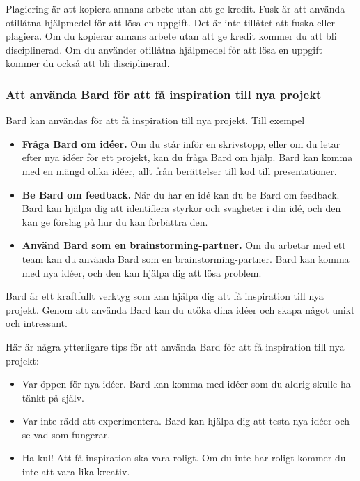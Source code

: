 Plagiering är att kopiera annans arbete utan att ge kredit. Fusk är att
använda otillåtna hjälpmedel för att lösa en uppgift. Det är inte
tillåtet att fuska eller plagiera. Om du kopierar annans arbete utan att
ge kredit kommer du att bli disciplinerad. Om du använder otillåtna
hjälpmedel för att lösa en uppgift kommer du också att bli
disciplinerad.

\hypertarget{att-anvuxe4nda-bard-fuxf6r-att-fuxe5-inspiration-till-nya-projekt}{%
\subsubsection{Att använda Bard för att få inspiration till nya
projekt}\label{att-anvuxe4nda-bard-fuxf6r-att-fuxe5-inspiration-till-nya-projekt}}

Bard kan användas för att få inspiration till nya projekt. Till exempel

\begin{itemize}
\tightlist
\item
  \textbf{Fråga Bard om idéer.} Om du står inför en skrivstopp, eller om
  du letar efter nya idéer för ett projekt, kan du fråga Bard om hjälp.
  Bard kan komma med en mängd olika idéer, allt från berättelser till
  kod till presentationer.
\item
  \textbf{Be Bard om feedback.} När du har en idé kan du be Bard om
  feedback. Bard kan hjälpa dig att identifiera styrkor och svagheter i
  din idé, och den kan ge förslag på hur du kan förbättra den.
\item
  \textbf{Använd Bard som en brainstorming-partner.} Om du arbetar med
  ett team kan du använda Bard som en brainstorming-partner. Bard kan
  komma med nya idéer, och den kan hjälpa dig att lösa problem.
\end{itemize}

Bard är ett kraftfullt verktyg som kan hjälpa dig att få inspiration
till nya projekt. Genom att använda Bard kan du utöka dina idéer och
skapa något unikt och intressant.

Här är några ytterligare tips för att använda Bard för att få
inspiration till nya projekt:

\begin{itemize}
\tightlist
\item
  Var öppen för nya idéer. Bard kan komma med idéer som du aldrig skulle
  ha tänkt på själv.
\item
  Var inte rädd att experimentera. Bard kan hjälpa dig att testa nya
  idéer och se vad som fungerar.
\item
  Ha kul! Att få inspiration ska vara roligt. Om du inte har roligt
  kommer du inte att vara lika kreativ.
\end{itemize}

